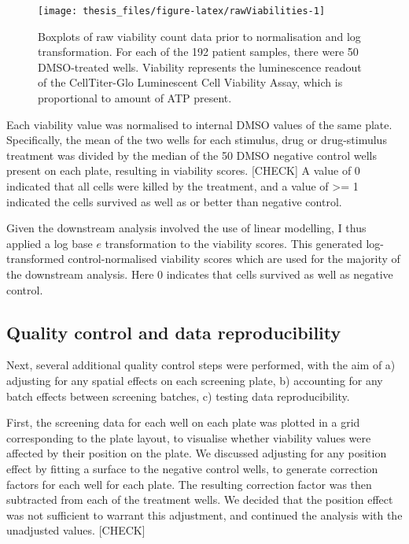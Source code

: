 \documentclass[11pt, a4paper, twosided]{book}
\begin{document}
\begin{figure}

{\centering \texttt{[image: thesis\_files/figure-latex/rawViabilities-1]} 

}

\caption{Boxplots of raw viability count data prior to normalisation and log transformation. For each of the 192 patient samples, there were 50 DMSO-treated wells. Viability represents the luminescence readout of the CellTiter-Glo Luminescent Cell Viability Assay, which is proportional to amount of ATP present.}\label{fig:rawViabilities}
\end{figure}
Each viability value was normalised to internal DMSO values of the same plate. Specifically, the mean of the two wells for each stimulus, drug or drug-stimulus treatment was divided by the median of the 50 DMSO negative control wells present on each plate, resulting in viability scores. {[}CHECK{]} A value of 0 indicated that all cells were killed by the treatment, and a value of \textgreater= 1 indicated the cells survived as well as or better than negative control.

Given the downstream analysis involved the use of linear modelling, I thus applied a log base \(e\) transformation to the viability scores. This generated log-transformed control-normalised viability scores which are used for the majority of the downstream analysis. Here 0 indicates that cells survived as well as negative control.

\hypertarget{quality-control-and-data-reproducibility}{%
\subsection{Quality control and data reproducibility}\label{quality-control-and-data-reproducibility}}

Next, several additional quality control steps were performed, with the aim of a) adjusting for any spatial effects on each screening plate, b) accounting for any batch effects between screening batches, c) testing data reproducibility.

First, the screening data for each well on each plate was plotted in a grid corresponding to the plate layout, to visualise whether viability values were affected by their position on the plate. We discussed adjusting for any position effect by fitting a surface to the negative control wells, to generate correction factors for each well for each plate. The resulting correction factor was then subtracted from each of the treatment wells. We decided that the position effect was not sufficient to warrant this adjustment, and continued the analysis with the unadjusted values. {[}CHECK{]}
\end{document}
